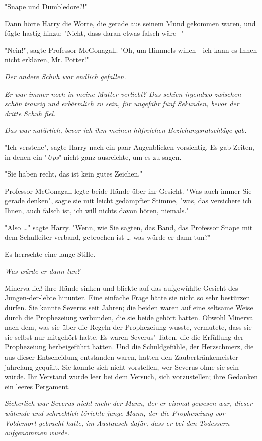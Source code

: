{"Snape und Dumbledore?!"

Dann hörte Harry die Worte, die gerade aus seinem Mund gekommen waren, und fügte hastig hinzu: "Nicht, dass daran etwas falsch wäre -"

"Nein!", sagte Professor McGonagall. "Oh, um Himmels willen - ich kann es Ihnen nicht erklären, Mr. Potter!"

\emph{Der andere Schuh war endlich gefallen.}

\emph{Er war immer noch in meine Mutter verliebt? Das schien irgendwo zwischen schön traurig und erbärmlich zu sein, für ungefähr fünf Sekunden, bevor der dritte Schuh fiel.}

\emph{Das war natürlich, bevor ich ihm meinen hilfreichen Beziehungsratschläge gab.}

"Ich verstehe", sagte Harry nach ein paar Augenblicken vorsichtig. Es gab Zeiten, in denen ein "\emph{Ups}" nicht ganz ausreichte, um es zu sagen.

"Sie haben recht, das ist kein gutes Zeichen."

Professor McGonagall legte beide Hände über ihr Gesicht. "Was auch immer Sie gerade denken", sagte sie mit leicht gedämpfter Stimme, "was, das versichere ich Ihnen, auch falsch ist, ich will nichts davon hören, niemals."

"Also …" sagte Harry. "Wenn, wie Sie sagten, das Band, das Professor Snape mit dem Schulleiter verband, gebrochen ist … was würde er dann tun?"

Es herrschte eine lange Stille.

\emph{Was würde er dann tun?}

Minerva ließ ihre Hände sinken und blickte auf das aufgewühlte Gesicht des Jungen-der-lebte hinunter. Eine einfache Frage hätte sie nicht so sehr bestürzen dürfen. Sie kannte Severus seit Jahren; die beiden waren auf eine seltsame Weise durch die Prophezeiung verbunden, die sie beide gehört hatten. Obwohl Minerva nach dem, was sie über die Regeln der Prophezeiung wusste, vermutete, dass sie sie selbst nur mitgehört hatte. Es waren Severus' Taten, die die Erfüllung der Prophezeiung herbeigeführt hatten. Und die Schuldgefühle, der Herzschmerz, die aus dieser Entscheidung entstanden waren, hatten den Zaubertränkemeister jahrelang gequält. Sie konnte sich nicht vorstellen, wer Severus ohne sie sein würde. Ihr Verstand wurde leer bei dem Versuch, sich vorzustellen; ihre Gedanken ein leeres Pergament.

\emph{Sicherlich war Severus nicht mehr der Mann, der er einmal gewesen war, dieser wütende und schrecklich törichte junge Mann, der die Prophezeiung vor Voldemort gebracht hatte, im Austausch dafür, dass er bei den Todessern aufgenommen wurde.}

}
